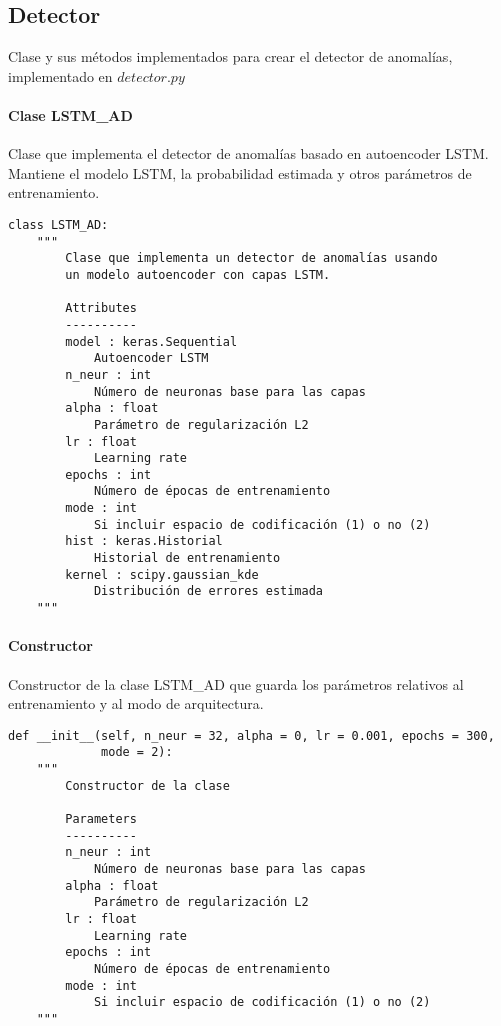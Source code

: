 \subsection{Detector}

Clase y sus métodos implementados para crear el detector de anomalías, implementado en $detector.py$

\paragraph{Clase LSTM\_AD}

Clase que implementa el detector de anomalías basado en autoencoder LSTM. Mantiene el modelo LSTM, la probabilidad estimada y otros parámetros de entrenamiento.

\begin{lstlisting}
class LSTM_AD:
    """
        Clase que implementa un detector de anomalías usando
        un modelo autoencoder con capas LSTM.

        Attributes
        ----------
        model : keras.Sequential
            Autoencoder LSTM
        n_neur : int
            Número de neuronas base para las capas
        alpha : float
            Parámetro de regularización L2
        lr : float
            Learning rate
        epochs : int
            Número de épocas de entrenamiento
        mode : int
            Si incluir espacio de codificación (1) o no (2)
        hist : keras.Historial
            Historial de entrenamiento
        kernel : scipy.gaussian_kde
            Distribución de errores estimada
    """
\end{lstlisting}

\paragraph{Constructor}

Constructor de la clase LSTM\_AD que guarda los parámetros relativos al entrenamiento y al modo de arquitectura.

\begin{lstlisting}
def __init__(self, n_neur = 32, alpha = 0, lr = 0.001, epochs = 300,
             mode = 2):
    """
        Constructor de la clase

        Parameters
        ----------
        n_neur : int
            Número de neuronas base para las capas
        alpha : float
            Parámetro de regularización L2
        lr : float
            Learning rate
        epochs : int
            Número de épocas de entrenamiento
        mode : int
            Si incluir espacio de codificación (1) o no (2)
    """
\end{lstlisting}

